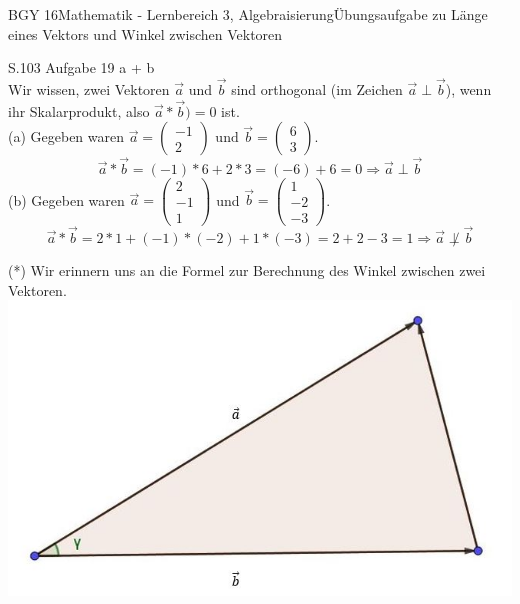 \documentclass[oneside,openany,headings=optiontotoc,11pt,numbers=noenddot]{scrreprt}
\begin{document}
\begin{worksheet}{BGY 16}{Mathematik - Lernbereich 3, Algebraisierung}{Übungsaufgabe zu Länge eines Vektors und Winkel zwischen Vektoren}
\begin{framed}
			\par\bigskip\noindent
			\tiny{\color{codegray}S.103 Aufgabe 19 a + b}\\
			\normalsize
			Wir wissen, zwei Vektoren \(\vec{a}\) und \(\vec{b}\) sind orthogonal (im Zeichen \(\vec{a}\perp\vec{b}\)), wenn ihr Skalarprodukt, also \(\vec{a}*\vec{b}) = 0\) ist.\\
			(a) Gegeben waren \(\vec{a} = \left(\begin{array}{c}-1\\2\end{array}\right) \text{ und } \vec{b}=\left(\begin{array}{c}6\\3\end{array}\right)\).
			\[\vec{a}*\vec{b} = (-1)*6 + 2*3 = (-6) + 6 = 0 \Rightarrow \vec{a}\perp\vec{b}\]
			(b) Gegeben waren \(\vec{a} = \left(\begin{array}{c}2\\-1\\1\end{array}\right)\) und \(\vec{b} = \left(\begin{array}{c}1\\-2\\-3\end{array}\right)\).
			\[\vec{a}*\vec{b} = 2*1 + (-1)*(-2) + 1*(-3) = 2 +2 - 3 = 1 \Rightarrow \vec{a}\not\perp\vec{b}\]
		\end{framed}
		\par\bigskip\noindent
		\begin{framed}
			\noindent
			(*) Wir erinnern uns an die Formel zur Berechnung des Winkel zwischen zwei Vektoren.\\
			\centering
			\includegraphics[scale=0.45]{Bilder/Dreieck.jpg}\\

\end{framed}
\end{worksheet}
\end{document}
